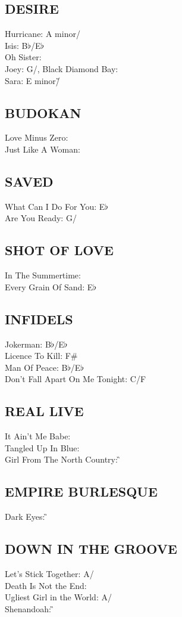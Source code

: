 \documentclass[a4paper,twoside]{memoir}
\begin{document}
\subsection{DESIRE}
Hurricane: A minor/\C\\ Isis: B$\flat$/E$\flat$\\ Oh Sister: \G\\ Joey: G/\C,
Black Diamond Bay: \G\\ Sara: E minor/\G


\subsection{BUDOKAN}
Love Minus Zero: \D\\ Just Like A Woman: \E


\subsection{SAVED}
What Can I Do For You: E$\flat$\\ Are You Ready: G/\C


\subsection{SHOT OF LOVE}
In The Summertime: \A\\ Every Grain Of Sand: E$\flat$


\subsection{INFIDELS}
Jokerman: B$\flat$/E$\flat$\\ Licence To Kill: F\#\\ Man Of Peace: B$\flat$/E$\flat$\\ Don't Fall Apart On Me Tonight: C/F


\subsection{REAL LIVE}
It Ain't Me Babe: \G\\ Tangled Up In Blue: \A\\ Girl From The North Country: \G


\subsection{EMPIRE BURLESQUE}
Dark Eyes: \G


\subsection{DOWN IN THE GROOVE}
Let's Stick Together: A/\D\\ Death Is Not the End: \A\\ Ugliest Girl in the World: A/\D\\ Shenandoah: \G
\end{document}
